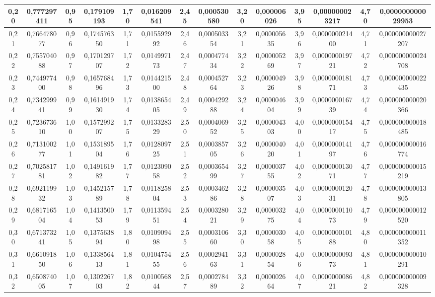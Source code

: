 \documentclass[a4paper,8pt]{article}
\begin{document}
\begin{table}[!ht]
{\begin{tabular}{|c|c||c|c||c|c||c|c||c|c||c|c||c|c||}
        0,20 & 0,777297411 & 0,95 & 0,179109193 & 1,70 & 0,016209541 & 2,45 & 0,000530580 & 3,20 & 0,000006026 & 3,95 & 0,000000023217 & 4,70 & 0,000000000029953 \\ \hline
        0,21 & 0,766478077 & 0,96 & 0,174576350 & 1,71 & 0,015592992 & 2,46 & 0,000503354 & 3,21 & 0,000005635 & 3,96 & 0,000000021400 & 4,71 & 0,000000000027207 \\ \hline
        0,22 & 0,755704088 & 0,97 & 0,170129707 & 1,72 & 0,014997173 & 2,47 & 0,000477434 & 3,22 & 0,000005269 & 3,97 & 0,000000019721 & 4,72 & 0,000000000024708 \\ \hline
        0,23 & 0,744977400 & 0,98 & 0,165768496 & 1,73 & 0,014421500 & 2,48 & 0,000452764 & 3,23 & 0,000004926 & 3,98 & 0,000000018171 & 4,73 & 0,000000000022435 \\ \hline
        0,24 & 0,734299941 & 0,99 & 0,161491930 & 1,74 & 0,013865405 & 2,49 & 0,000429288 & 3,24 & 0,000004604 & 3,99 & 0,000000016739 & 4,74 & 0,000000000020366 \\ \hline
        0,25 & 0,723673610 & 1,00 & 0,157299207 & 1,75 & 0,013328329 & 2,50 & 0,000406952 & 3,25 & 0,000004303 & 4,00 & 0,000000015417 & 4,75 & 0,000000000018485 \\ \hline
        0,26 & 0,713100277 & 1,01 & 0,153189504 & 1,76 & 0,012809725 & 2,51 & 0,000385705 & 3,26 & 0,000004020 & 4,01 & 0,000000014197 & 4,76 & 0,000000000016774 \\ \hline
        0,27 & 0,702581781 & 1,02 & 0,149161982 & 1,77 & 0,012309058 & 2,52 & 0,000365499 & 3,27 & 0,000003755 & 4,02 & 0,000000013071 & 4,77 & 0,000000000015219 \\ \hline
        0,28 & 0,692119932 & 1,03 & 0,145215789 & 1,78 & 0,011825804 & 2,53 & 0,000346286 & 3,28 & 0,000003507 & 4,03 & 0,000000012031 & 4,78 & 0,000000000013805 \\ \hline
        0,29 & 0,681716504 & 1,04 & 0,141350053 & 1,79 & 0,011359451 & 2,54 & 0,000328021 & 3,29 & 0,000003275 & 4,04 & 0,000000011073 & 4,79 & 0,000000000012520 \\ \hline
        0,30 & 0,671373241 & 1,05 & 0,137563894 & 1,80 & 0,010909498 & 2,55 & 0,000310660 & 3,30 & 0,000003058 & 4,05 & 0,000000010188 & 4,80 & 0,000000000011352 \\ \hline
        0,31 & 0,661091850 & 1,06 & 0,133856413 & 1,81 & 0,010475455 & 2,56 & 0,000294163 & 3,31 & 0,000002854 & 4,06 & 0,000000009373 & 4,81 & 0,000000000010291 \\ \hline
        0,32 & 0,650874005 & 1,07 & 0,130226703 & 1,82 & 0,010056844 & 2,57 & 0,000278489 & 3,32 & 0,000002664 & 4,07 & 0,000000008621 & 4,82 & 0,000000000009328 \\ \hline

\end{tabular}}
\end{table}
\end{document}
